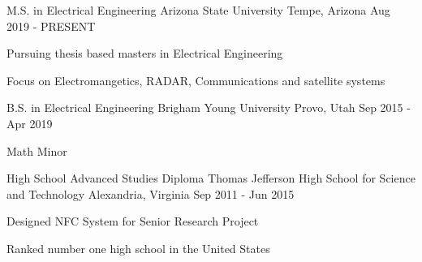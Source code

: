 

\begin{cventries}

    \cventry
    {M.S. in Electrical Engineering} %
    {Arizona State University} %
    {Tempe, Arizona} %
    {Aug 2019 - PRESENT} %
    {
        \begin{cvitems} %
        \item {Pursuing thesis based masters in Electrical Engineering}
        \item {Focus on Electromangetics, RADAR, Communications and satellite systems}
        \end{cvitems}
    }

    \cventry
    {B.S. in Electrical Engineering} %
    {Brigham Young University} %
    {Provo, Utah} %
    {Sep 2015 - Apr 2019} %
    {
        \begin{cvitems} %
        \item {Math Minor}
        \end{cvitems}
    }

    \cventry
    {High School Advanced Studies Diploma} %
    {Thomas Jefferson High School for Science and Technology} %
    {Alexandria, Virginia} %
    {Sep 2011 - Jun 2015} %
    {
        \begin{cvitems} %
        \item {Designed NFC System for Senior Research Project}
        \item {Ranked number one high school in the United States} 
        \end{cvitems}
    }

\end{cventries}
